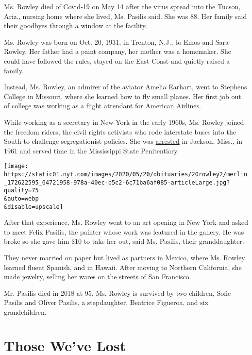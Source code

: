 Ms. Rowley died of Covid-19 on May 14 after the virus spread into the
Tucson, Ariz., nursing home where she lived, Ms. Pasilis said. She was
88. Her family said their goodbyes through a window at the facility.

Ms. Rowley was born on Oct. 20, 1931, in Trenton, N.J., to Emos and Sara
Rowley. Her father had a paint company, her mother was a homemaker. She
could have followed the rules, stayed on the East Coast and quietly
raised a family.

Instead, Ms. Rowley, an admirer of the aviator Amelia Earhart, went to
Stephens College in Missouri, where she learned how to fly small planes.
Her first job out of college was working as a flight attendant for
American Airlines.

While working as a secretary in New York in the early 1960s, Ms. Rowley
joined the freedom riders, the civil rights activists who rode
interstate buses into the South to challenge segregationist policies.
She was
\href{http://crdl.usg.edu/export/html/mus/sovcomph/crdl_mus_sovcomph_2-55-6-83-1-1-1.html}{arrested}
in Jackson, Miss., in 1961 and served time in the Mississippi State
Penitentiary.

\texttt{[image: https://static01.nyt.com/images/2020/05/20/obituaries/20rowley2/merlin\_172622595\_64721958-978a-40ec-b5c2-6c71ba6af085-articleLarge.jpg?quality=75\\\&auto=webp\\\&disable=upscale]}

After that experience, Ms. Rowley went to an art opening in New York and
asked to meet Felix Pasilis, the painter whose work was featured in the
gallery. He was broke so she gave him \$10 to take her out, said Ms.
Pasilis, their granddaughter.

They never married on paper but lived as partners in Mexico, where Ms.
Rowley learned fluent Spanish, and in Hawaii. After moving to Northern
California, she made jewelry, selling her wares on the streets of San
Francisco.

Mr. Pasilis died in 2018 at 95. Ms. Rowley is survived by two children,
Sofie Pasilis and Oliver Pasilis, a stepdaughter, Beatrice Figueroa, and
six grandchildren.

\href{https://www.nytimes.com/interactive/2020/obituaries/people-died-coronavirus-obituaries.html?action=click\&pgtype=Article\&state=default\&region=BELOW_MAIN_CONTENT\&context=covid_obits_promo}{}

\hypertarget{those-weve-lost}{%
\section{Those We've Lost}\label{those-weve-lost}}

